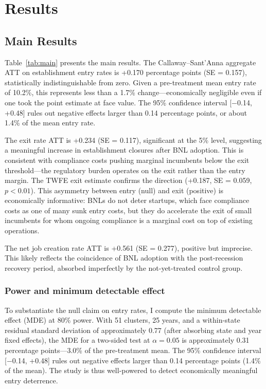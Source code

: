 \documentclass[12pt]{article}
\begin{document}
\section{Results}

\subsection{Main Results}



Table~\ref{tab:main} presents the main results. The Callaway--Sant'Anna aggregate ATT on establishment entry rates is +0.170 percentage points (SE = 0.157), statistically indistinguishable from zero. Given a pre-treatment mean entry rate of 10.2\%, this represents less than a 1.7\% change---economically negligible even if one took the point estimate at face value. The 95\% confidence interval [$-$0.14, +0.48] rules out negative effects larger than 0.14 percentage points, or about 1.4\% of the mean entry rate.

The exit rate ATT is +0.234 (SE = 0.117), significant at the 5\% level, suggesting a meaningful increase in establishment closures after BNL adoption. This is consistent with compliance costs pushing marginal incumbents below the exit threshold---the regulatory burden operates on the exit rather than the entry margin. The TWFE exit estimate confirms the direction (+0.187, SE = 0.059, $p < 0.01$). This asymmetry between entry (null) and exit (positive) is economically informative: BNLs do not deter startups, which face compliance costs as one of many sunk entry costs, but they do accelerate the exit of small incumbents for whom ongoing compliance is a marginal cost on top of existing operations.

The net job creation rate ATT is +0.561 (SE = 0.277), positive but imprecise. This likely reflects the coincidence of BNL adoption with the post-recession recovery period, absorbed imperfectly by the not-yet-treated control group.

\subsubsection*{Power and minimum detectable effect} To substantiate the null claim on entry rates, I compute the minimum detectable effect (MDE) at 80\% power. With 51 clusters, 25 years, and a within-state residual standard deviation of approximately 0.77 (after absorbing state and year fixed effects), the MDE for a two-sided test at $\alpha = 0.05$ is approximately 0.31 percentage points---3.0\% of the pre-treatment mean. The 95\% confidence interval [$-$0.14, +0.48] rules out negative effects larger than 0.14 percentage points (1.4\% of the mean). The study is thus well-powered to detect economically meaningful entry deterrence.
\end{document}
